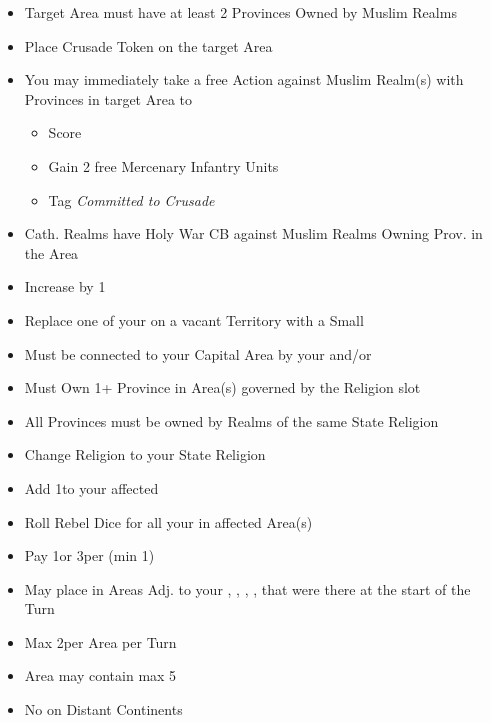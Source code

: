 \documentclass[10pt]{article}
\begin{document}
\begin{itemize}
	\item Target Area must have at least 2 Provinces Owned by Muslim Realms
	\item Place Crusade Token on the target Area
	\item You may immediately take a free  Action against Muslim Realm(s) with Provinces in target Area to
	\begin{itemize}
		\item Score 
		\item Gain 2 free Mercenary Infantry Units
		\item Tag \emph{Committed to Crusade}
	\end{itemize}
	\item Cath. Realms have Holy War CB against Muslim Realms Owning Prov. in the Area	
\end{itemize}

\begin{itemize}
	\item Increase \stability by 1
\end{itemize}

\begin{itemize}
	\item Replace one of your \claims on a vacant Territory with a Small \town
	\item Must be connected to your Capital Area by your \towns and/or \ships
\end{itemize}

\begin{itemize}
	\item Must Own 1+ Province in Area(s) governed by the Religion slot
	\item All Provinces must be owned by Realms of the same State Religion
	\item Change Religion to your State Religion
	\item Add 1\unrest to your affected \towns
	\item Roll Rebel Dice for all your \unrest in affected Area(s)
\end{itemize}

\begin{itemize}
	\item Pay 1\diplopower or 3\ducats per \influence (min 1\diplopower)
	\item May place \influence in Areas Adj. to your \towns, \vassals, \alliances, \marriages, \influence that were there at the start of the Turn
	\item Max 2\influence per Area per Turn
	\item Area may contain max 5\influence
	\item No \influence on Distant Continents
\end{itemize}
\end{document}
